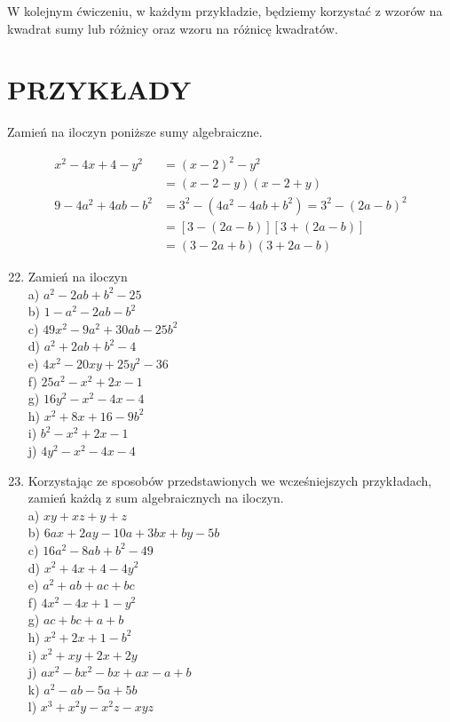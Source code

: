 \documentclass[10pt]{article}
\begin{document}
W kolejnym ćwiczeniu, w każdym przykładzie, będziemy korzystać z wzorów na kwadrat sumy lub różnicy oraz wzoru na różnicę kwadratów.

\section*{PRZYKŁADY}
Zamień na iloczyn poniższe sumy algebraiczne.

\[
\begin{aligned}
x^{2}-4 x+4-y^{2} & =(x-2)^{2}-y^{2} \\
& =(x-2-y)(x-2+y) \\
9-4 a^{2}+4 a b-b^{2} & =3^{2}-\left(4 a^{2}-4 a b+b^{2}\right)=3^{2}-(2 a-b)^{2} \\
& =[3-(2 a-b)][3+(2 a-b)] \\
& =(3-2 a+b)(3+2 a-b)
\end{aligned}
\]

\begin{enumerate}
  \setcounter{enumi}{21}
  \item Zamień na iloczyn\\
a) \(a^{2}-2 a b+b^{2}-25\)\\
b) \(1-a^{2}-2 a b-b^{2}\)\\
c) \(49 x^{2}-9 a^{2}+30 a b-25 b^{2}\)\\
d) \(a^{2}+2 a b+b^{2}-4\)\\
e) \(4 x^{2}-20 x y+25 y^{2}-36\)\\
f) \(25 a^{2}-x^{2}+2 x-1\)\\
g) \(16 y^{2}-x^{2}-4 x-4\)\\
h) \(x^{2}+8 x+16-9 b^{2}\)\\
i) \(b^{2}-x^{2}+2 x-1\)\\
j) \(4 y^{2}-x^{2}-4 x-4\)
  \item Korzystając ze sposobów przedstawionych we wcześniejszych przykładach, zamień każdą z sum algebraicznych na iloczyn.\\
a) \(x y+x z+y+z\)\\
b) \(6 a x+2 a y-10 a+3 b x+b y-5 b\)\\
c) \(16 a^{2}-8 a b+b^{2}-49\)\\
d) \(x^{2}+4 x+4-4 y^{2}\)\\
e) \(a^{2}+a b+a c+b c\)\\
f) \(4 x^{2}-4 x+1-y^{2}\)\\
g) \(a c+b c+a+b\)\\
h) \(x^{2}+2 x+1-b^{2}\)\\
i) \(x^{2}+x y+2 x+2 y\)\\
j) \(a x^{2}-b x^{2}-b x+a x-a+b\)\\
k) \(a^{2}-a b-5 a+5 b\)\\
l) \(x^{3}+x^{2} y-x^{2} z-x y z\)
\end{enumerate}
\end{document}

